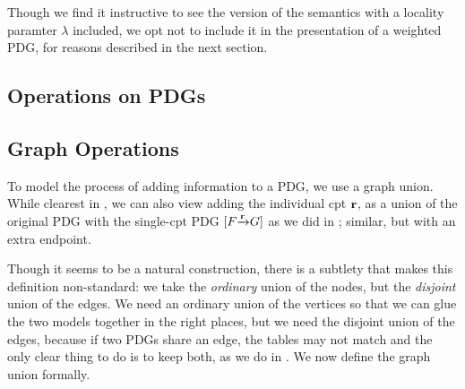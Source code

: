 \documentclass{article}
\newcommand{\MN}{PDG}
\numberwithin{equation}{section}
\begin{document}
	Though we find it instructive to see the version of the semantics with a locality paramter $\lambda$ included, we opt not to include it in the presentation of a weighted PDG, for reasons described in the next section.
	
	\begin{vfull}
	\section{Operations on PDGs}\label{sec:pdg-operations}
	\subsection{Graph Operations}
	To model the process of adding information to a \MN, we use a graph union. While clearest in , we can also view adding the individual cpt $\mathbf r$, as a union of the original PDG with the single-cpt PDG $[F \smash{\xrightarrow{\mathbf r}} G]$ as we did in ;  similar, but with an extra endpoint.
	
	Though it seems to be a natural construction, there is a subtlety that makes this definition non-standard: we take the \emph{ordinary} union of the nodes, but the \emph{disjoint} union of the edges. We need an ordinary union of the vertices so that we can glue the two models together in the right places, but we need the disjoint union of the edges, because if two PDGs share an edge, the tables may not match and the only clear thing to do is to keep both, as we do in . 
	We now define the graph union formally. 


\end{vfull}
\end{document}

